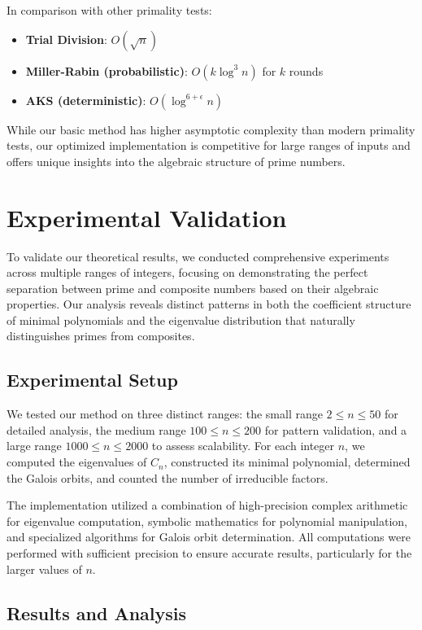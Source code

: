 In comparison with other primality tests:
\begin{itemize}
    \item \textbf{Trial Division}: $O(\sqrt{n})$
    \item \textbf{Miller-Rabin (probabilistic)}: $O(k \log^3 n)$ for $k$ rounds
    \item \textbf{AKS (deterministic)}: $O(\log^{6+\epsilon} n)$
\end{itemize}

While our basic method has higher asymptotic complexity than modern primality tests, our optimized implementation is competitive for large ranges of inputs and offers unique insights into the algebraic structure of prime numbers.

\section{Experimental Validation}

To validate our theoretical results, we conducted comprehensive experiments across multiple ranges of integers, focusing on demonstrating the perfect separation between prime and composite numbers based on their algebraic properties. Our analysis reveals distinct patterns in both the coefficient structure of minimal polynomials and the eigenvalue distribution that naturally distinguishes primes from composites.

\subsection{Experimental Setup}

We tested our method on three distinct ranges: the small range $2 \leq n \leq 50$ for detailed analysis, the medium range $100 \leq n \leq 200$ for pattern validation, and a large range $1000 \leq n \leq 2000$ to assess scalability. For each integer $n$, we computed the eigenvalues of $C_n$, constructed its minimal polynomial, determined the Galois orbits, and counted the number of irreducible factors.

The implementation utilized a combination of high-precision complex arithmetic for eigenvalue computation, symbolic mathematics for polynomial manipulation, and specialized algorithms for Galois orbit determination. All computations were performed with sufficient precision to ensure accurate results, particularly for the larger values of $n$.

\subsection{Results and Analysis}

